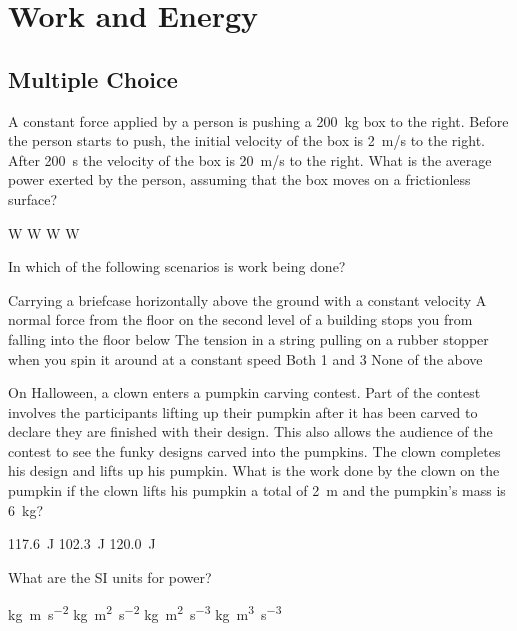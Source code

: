 \section{Work and Energy}

\subsection{Multiple Choice}
\question A constant force applied by a person is pushing a \SI{200}{kg} box to the right. Before the person starts to push, the initial velocity of the box is \SI{2}{m/s} to the right. After \SI{200}{s} the velocity of the box is \SI{20}{m/s} to the right. What is the average power exerted by the person, assuming that the box moves on a frictionless surface?
\begin{checkboxes}
 W
 W \correct
{} W
 W
\end{checkboxes}


\question In which of the following scenarios is work being done?
\begin{checkboxes}
\choice Carrying a briefcase horizontally above the ground with a constant velocity
\choice A normal force from the floor on the second level of a building stops you from falling into the floor below
\choice The tension in a string pulling on a rubber stopper when you spin it around at a constant speed
\choice Both 1 and 3
\CorrectChoice None of the above \correct
\end{checkboxes}


\question On Halloween, a clown enters a pumpkin carving contest. Part of the contest involves the participants lifting up their pumpkin after it has been carved to declare they are finished with their design. This also allows the audience of the contest to see the funky designs carved into the pumpkins. The clown completes his design and lifts up his pumpkin. What is the work done by the clown on the pumpkin if the clown lifts his pumpkin a total of \SI{2}{m} and the pumpkin's mass is \SI{6}{kg}?
\begin{checkboxes}
\CorrectChoice \SI{117.6}{J} \correct
\choice \SI{102.3}{J}
\choice \SI{120.0}{J}
\end{checkboxes}


\question What are the SI units for power? 
\begin{checkboxes}
\choice \si{kg m s^{-2}} 
\choice \si{kg m^2 s^{-2}} 
\CorrectChoice \si{kg m^2 s^{-3}} \correct
\choice \si{kg m^3 s^{-3}} 
\end{checkboxes}


